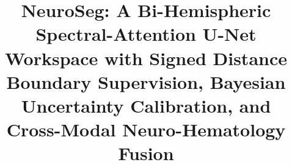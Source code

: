 \documentclass[journal,onecolumn,10pt]{IEEEtran}
\begin{document}
\sloppy

\title{NeuroSeg: A Bi-Hemispheric Spectral-Attention U-Net Workspace with Signed Distance Boundary Supervision, Bayesian Uncertainty Calibration, and Cross-Modal Neuro-Hematology Fusion}

\author{\\
}

\maketitle
\end{document}
